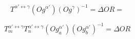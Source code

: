 $$T^{\alpha'\leftrightarrow\gamma}\left(Og^{\alpha'}\right)\left(Og^{\gamma}\right)^{-1}=\Delta OR=\label{eq:1}$$

$$T_{m}^{\alpha'\leftrightarrow\gamma}T_{n}^{\alpha'\leftrightarrow\gamma}\left(Og_{a}^{\alpha'}\right)\left(Og_{b}^{\alpha'}\right)^{-1}=\Delta OR\label{eq:2}$$
